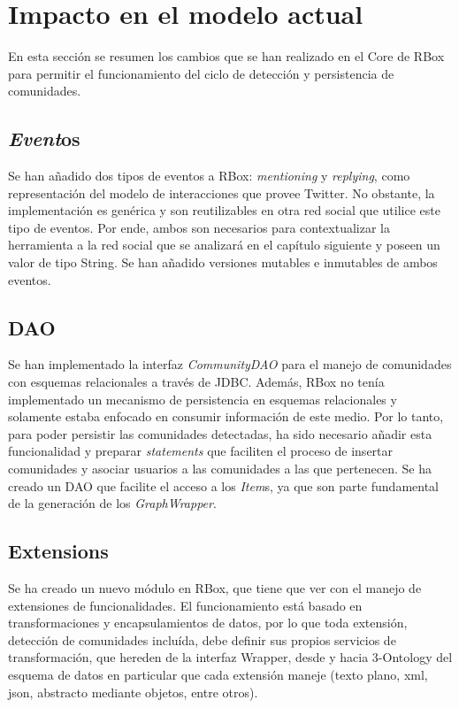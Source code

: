 \section{Impacto en el modelo actual}

En esta sección se resumen los cambios que se han realizado en el Core de RBox para permitir el funcionamiento del ciclo de detección y persistencia de comunidades.

\subsection{\textit{Event}os}

Se han añadido dos tipos de eventos a RBox: \textit{mentioning} y \textit{replying}, como representación del modelo de interacciones que provee Twitter. No obstante, la implementación es genérica y son reutilizables en otra red social que utilice este tipo de eventos. Por ende, ambos son necesarios para contextualizar la herramienta a la red social que se analizará en el capítulo siguiente y poseen un valor de tipo String. Se han añadido versiones mutables e inmutables de ambos eventos.

\subsection{DAO}

Se han implementado la interfaz \textit{CommunityDAO} para el manejo de comunidades con esquemas relacionales a través de JDBC. Además, RBox no tenía implementado un mecanismo de persistencia en esquemas relacionales y solamente estaba enfocado en consumir información de este medio. Por lo tanto, para poder persistir las comunidades detectadas, ha sido necesario añadir esta funcionalidad y preparar \textit{statements} que faciliten el proceso de insertar comunidades y asociar usuarios a las comunidades a las que pertenecen. Se ha creado un DAO que facilite el acceso a los \textit{Item}s, ya que son parte fundamental de la generación de los \textit{\textit{Graph}Wrapper}.

\subsection{Extensions}

Se ha creado un nuevo módulo en RBox, que tiene que ver con el manejo de extensiones de funcionalidades. El funcionamiento está basado en transformaciones y encapsulamientos de datos, por lo que toda extensión, detección de comunidades incluída, debe definir sus propios servicios de transformación, que hereden de la interfaz Wrapper, desde y hacia 3-Ontology del esquema de datos en particular que cada extensión maneje (texto plano, xml, json, abstracto mediante objetos, entre otros).

